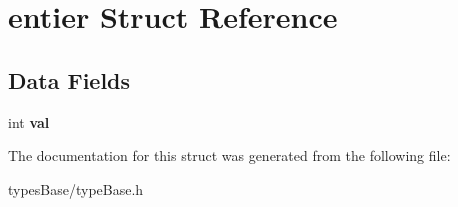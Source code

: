 \hypertarget{structentier}{\section{entier Struct Reference}
\label{structentier}
}
\subsection*{Data Fields}
\begin{DoxyCompactItemize}
\item 
\hypertarget{structentier_aa0ccb5ee6d882ee3605ff47745c6467b}{int {\bfseries val}}\label{structentier_aa0ccb5ee6d882ee3605ff47745c6467b}

\end{DoxyCompactItemize}


The documentation for this struct was generated from the following file\+:\begin{DoxyCompactItemize}
\item 
types\+Base/type\+Base.\+h\end{DoxyCompactItemize}
